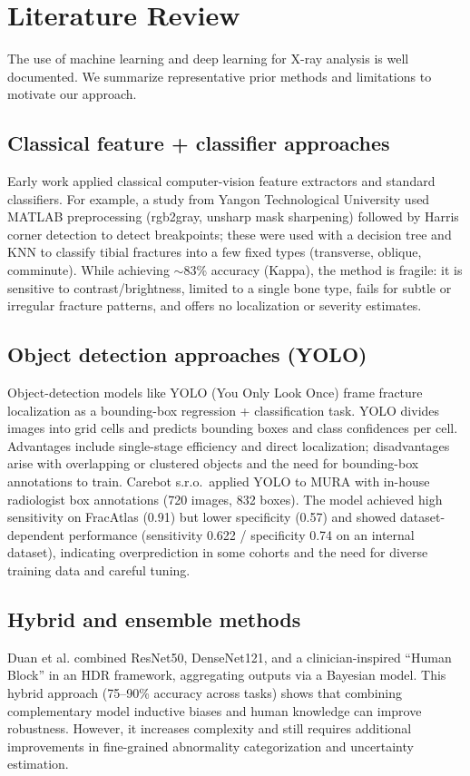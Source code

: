 \documentclass[conference]{IEEEtran}
\begin{document}
\section{Literature Review}
The use of machine learning and deep learning for X-ray analysis is well documented. We summarize representative prior methods and limitations to motivate our approach.

\subsection{Classical feature + classifier approaches}
Early work applied classical computer-vision feature extractors and standard classifiers. For example, a study from Yangon Technological University used MATLAB preprocessing (rgb2gray, unsharp mask sharpening) followed by Harris corner detection to detect breakpoints; these were used with a decision tree and KNN to classify tibial fractures into a few fixed types (transverse, oblique, comminute). While achieving $\sim$83\% accuracy (Kappa), the method is fragile: it is sensitive to contrast/brightness, limited to a single bone type, fails for subtle or irregular fracture patterns, and offers no localization or severity estimates.

\subsection{Object detection approaches (YOLO)}
Object-detection models like YOLO (You Only Look Once) frame fracture localization as a bounding-box regression + classification task. YOLO divides images into grid cells and predicts bounding boxes and class confidences per cell. Advantages include single-stage efficiency and direct localization; disadvantages arise with overlapping or clustered objects and the need for bounding-box annotations to train. Carebot s.r.o.\ applied YOLO to MURA with in-house radiologist box annotations (720 images, 832 boxes). The model achieved high sensitivity on FracAtlas (0.91) but lower specificity (0.57) and showed dataset-dependent performance (sensitivity 0.622 / specificity 0.74 on an internal dataset), indicating overprediction in some cohorts and the need for diverse training data and careful tuning.

\subsection{Hybrid and ensemble methods}
Duan et al. \cite{ref10} combined ResNet50, DenseNet121, and a clinician-inspired ``Human Block'' in an HDR framework, aggregating outputs via a Bayesian model. This hybrid approach (75--90\% accuracy across tasks) shows that combining complementary model inductive biases and human knowledge can improve robustness. However, it increases complexity and still requires additional improvements in fine-grained abnormality categorization and uncertainty estimation.
\end{document}

